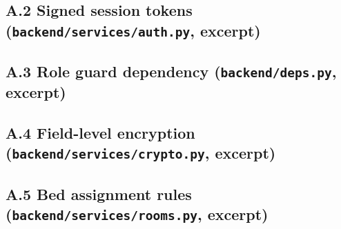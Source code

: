 \documentclass[12pt,a4paper,oneside]{report}
\begin{document}
\subsection*{A.2 Signed session tokens (\texttt{backend/services/auth.py}, excerpt)}

\subsection*{A.3 Role guard dependency (\texttt{backend/deps.py}, excerpt)}

\subsection*{A.4 Field-level encryption (\texttt{backend/services/crypto.py}, excerpt)}

\subsection*{A.5 Bed assignment rules (\texttt{backend/services/rooms.py}, excerpt)}

\end{document}
